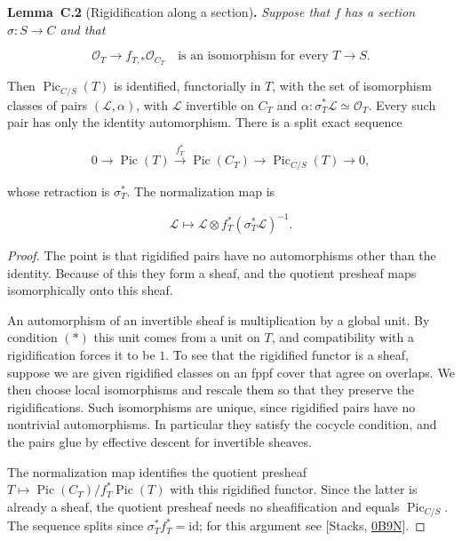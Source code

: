 \documentclass[11pt]{article}
\newenvironment{bpstatement}[2]{\par\addvspace{0.6\baselineskip}\noindent\textbf{#1}#2\textbf{.}\enspace\ignorespaces}
  {\par\addvspace{0.4\baselineskip}}
\newenvironment{bpstatementit}[2]{\begin{bpstatement}{#1}{#2}\itshape\ignorespaces}{\end{bpstatement}}
\begin{document}
\label{bp7}%
\begin{bpstatementit}{Lemma~C.2}{ (Rigidification along a section)}
Suppose that \(f\) has a section \(\sigma:S\to C\) and that

\[
\mathcal O_T\longrightarrow f_{T,*}\mathcal O_{C_T}
\quad\text{is an isomorphism for every }T\to S.
\tag{$\ast$}
\]

Then \(\operatorname{Pic}_{C/S}(T)\) is identified, functorially in \(T\), with the set of isomorphism classes of pairs \((\mathcal L,\alpha)\), with \(\mathcal L\) invertible on \(C_T\) and \(\alpha:\sigma_T^*\mathcal L\simeq\mathcal O_T\). Every such pair has only the identity automorphism. There is a split exact sequence

\[
0\longrightarrow\operatorname{Pic}(T)
\xrightarrow{f_T^*}\operatorname{Pic}(C_T)
\longrightarrow\operatorname{Pic}_{C/S}(T)
\longrightarrow0,
\]

whose retraction is \(\sigma_T^*\). The normalization map is

\[
\mathcal L\longmapsto
\mathcal L\otimes f_T^*(\sigma_T^*\mathcal L)^{-1}.
\]
\end{bpstatementit}

\begin{proof}[{Proof}]\label{bp8}%
The point is that rigidified pairs have no automorphisms other than the identity. Because of this they form a sheaf, and the quotient presheaf maps isomorphically onto this sheaf.

An automorphism of an invertible sheaf is multiplication by a global unit. By condition \((\ast)\) this unit comes from a unit on \(T\), and compatibility with a rigidification forces it to be \(1\). To see that the rigidified functor is a sheaf, suppose we are given rigidified classes on an fppf cover that agree on overlaps. We then choose local isomorphisms and rescale them so that they preserve the rigidifications. Such isomorphisms are unique, since rigidified pairs have no nontrivial automorphisms. In particular they satisfy the cocycle condition, and the pairs glue by effective descent for invertible sheaves.

The normalization map identifies the quotient presheaf \(T\mapsto\operatorname{Pic}(C_T)/f_T^*\operatorname{Pic}(T)\) with this rigidified functor. Since the latter is already a sheaf, the quotient presheaf needs no sheafification and equals \(\operatorname{Pic}_{C/S}\). The sequence splits since \(\sigma_T^*f_T^*=\mathrm{id}\); for this argument see [Stacks, \href{https://stacks.math.columbia.edu/tag/0B9N}{0B9N}].
\end{proof}
\end{document}
